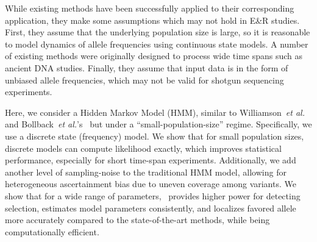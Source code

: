 While existing methods have been successfully applied to their
corresponding application, they make some assumptions which may not
hold in E\&R studies.  First, they assume that the underlying
population size is large, so it is reasonable to model dynamics of
allele frequencies using continuous state models. A number of existing
methods were originally designed to process wide time spans such as
ancient DNA studies. Finally, they assume that input data is in the
form of unbiased allele frequencies, which may not be valid for
shotgun sequencing experiments.

Here, we consider a Hidden Markov Model (HMM), similar to
Williamson~\emph{et al.}~\cite{williamson1999using} and
Bollback~\emph{et al.}'s~\cite{bollback2008estimation} but under a
``small-population-size'' regime. Specifically, we use a discrete
state (frequency) model.  We show that for small population sizes,
discrete models can compute likelihood exactly, which improves
statistical performance, especially for short time-span
experiments. Additionally, we add another level of sampling-noise to
the traditional HMM model, allowing for heterogeneous ascertainment
bias due to uneven coverage among variants. We show that for a wide
range of parameters, \comale\ provides higher power for detecting
selection, estimates model parameters consistently, and localizes
favored allele more accurately compared to the state-of-the-art
methods, while being computationally efficient.
